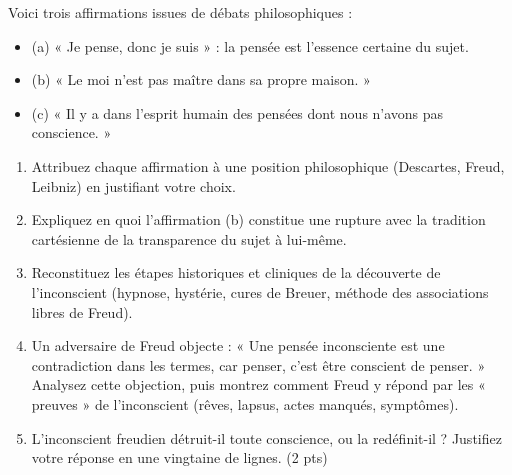 \documentclass[11pt]{article}
\begin{document}
\begin{exercice}
Voici trois affirmations issues de débats philosophiques :
\begin{itemize}
\item (a) « Je pense, donc je suis » : la pensée est l'essence certaine du sujet.
\item (b) « Le moi n'est pas maître dans sa propre maison. »
\item (c) « Il y a dans l'esprit humain des pensées dont nous n'avons pas conscience. »
\end{itemize}
\begin{enumerate}
\item Attribuez chaque affirmation à une position philosophique (Descartes, Freud, Leibniz) en justifiant votre choix.
\item Expliquez en quoi l'affirmation (b) constitue une rupture avec la tradition cartésienne de la transparence du sujet à lui-même.
\item Reconstituez les étapes historiques et cliniques de la découverte de l'inconscient (hypnose, hystérie, cures de Breuer, méthode des associations libres de Freud).
\item Un adversaire de Freud objecte : « Une pensée inconsciente est une contradiction dans les termes, car penser, c'est être conscient de penser. » Analysez cette objection, puis montrez comment Freud y répond par les « preuves » de l'inconscient (rêves, lapsus, actes manqués, symptômes).
\item L'inconscient freudien détruit-il toute conscience, ou la redéfinit-il ? Justifiez votre réponse en une vingtaine de lignes. (2 pts)
\end{enumerate}
\end{exercice}
\end{document}
